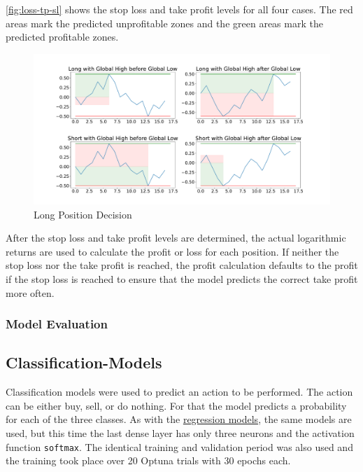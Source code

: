 \autoref{fig:loss-tp-sl} shows the stop loss and take profit levels for all four cases.
The red areas mark the predicted unprofitable zones and the green areas mark the predicted profitable zones.

\begin{figure}[H]
    \centering
    \includegraphics[width=\textwidth]{images/models/loss_tp_sl}
    \caption{Long Position Decision}
    \label{fig:loss-tp-sl}
\end{figure}

After the stop loss and take profit levels are determined, the actual logarithmic returns are used to calculate the profit or loss for each position.
If neither the stop loss nor the take profit is reached, the profit calculation defaults to the profit if the stop loss is reached to ensure that the model predicts the correct take profit more often.

\subsubsection{Model Evaluation}


\subsection{Classification-Models}
\label{chap:classification-models}

Classification models were used to predict an action to be performed.
The action can be either buy, sell, or do nothing.
For that the model predicts a probability for each of the three classes.
As with the \hyperref[chap:regression-models]{regression models}, the same models are used, but this time the last dense layer has only three neurons and the activation function \verb|softmax|.
The identical training and validation period was also used and the training took place over 20 Optuna trials with 30 epochs each.

